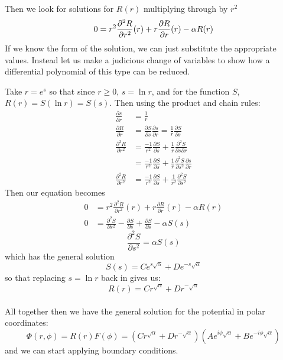 \documentclass{article}
\begin{document}
\begin{solution}
\paragraph{}
Then we look for solutions for $R(r)$ multiplying through by $r^{2}$
\[
0 = r^{2} \frac{\partial^{2} R}{\partial r^{2}}(r) +r \frac{\partial R}{\partial r}(r) -\alpha R(r)\\
\]
If we know the form of the solution, we can just substitute the appropriate values. Instead let us make a judicious change of variables to show how a differential polynomial of this type can be reduced.

Take $r=e^{s}$ so that since $r \ge 0$, $s=\ln r$, and for the function $S$, $R(r)=S(\ln r)=S(s)$.
Then using the product and chain rules:
\begin{align*}
\frac{\partial s}{\partial r} &= \frac{1}{r}\\
\frac{\partial R}{\partial r} &= \frac{\partial S}{\partial s}\frac{\partial s}{\partial r} = \frac{1}{r}\frac{\partial S}{\partial s}\\
\frac{\partial^{2} R}{\partial r^{2}} &= \frac{-1}{r^{2}}\frac{\partial S}{\partial s} + \frac{1}{r}\frac{\partial^{2} S}{\partial s\partial r}	\\
&= \frac{-1}{r^{2}}\frac{\partial S}{\partial s} + \frac{1}{r}\frac{\partial^{2} S}{\partial s^{2}}\frac{\partial s}{\partial r}\\
\frac{\partial^{2} R}{\partial r^{2}} &= \frac{-1}{r^{2}}\frac{\partial S}{\partial s} + \frac{1}{r^{2}}\frac{\partial^{2} S}{\partial s^{2}}
\end{align*}
Then our equation becomes
\begin{align*}
0 &= r^{2} \frac{\partial^{2} R}{\partial r^{2}}(r) +r \frac{\partial R}{\partial r}(r) -\alpha R(r)\\
0 &= \frac{\partial^{2} S}{\partial s^{2}} -\frac{\partial S}{\partial s} +\frac{\partial S}{\partial s} -\alpha S(s)
\end{align*}
\[ \frac{\partial^{2} S}{\partial s^{2}} = \alpha S(s) \]
which has the general solution
\[ S(s) = Ce^{s\sqrt{\alpha}} + De^{-s\sqrt{\alpha}} \]
so that replacing $s=\ln r$ back in gives us:
\[ R(r) = Cr^{\sqrt{\alpha}} + Dr^{-\sqrt{\alpha}} \]

\paragraph{}
All together then we have the general solution for the potential in polar coordinates:
\[ \Phi(r,\phi) = R(r)F(\phi) = \left( Cr^{\sqrt{\alpha}} + Dr^{-\sqrt{\alpha}} \right) \left( Ae^{i\phi\sqrt{\alpha}} + Be^{-i\phi\sqrt{\alpha}} \right) \]
and we can start applying boundary conditions.


\end{solution}
\end{document}
